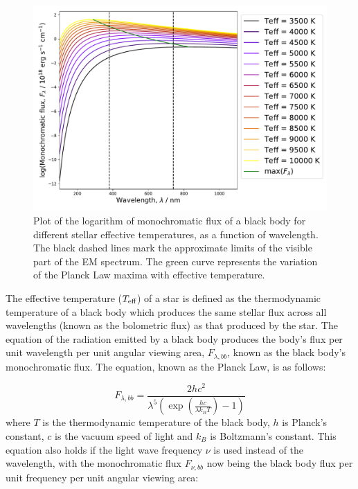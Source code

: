 \documentclass[12pt, a4paper]{report}
\begin{document}
\begin{figure}[h!]
\begin{center}
\includegraphics[width=1.0\textwidth]{blackbody_teff_logF_illustration.pdf}
\caption{Plot of the logarithm of monochromatic flux of a black body for different stellar effective temperatures, as a function of wavelength. The black dashed lines mark the approximate limits of the visible part of the EM spectrum. The green curve represents the variation of the Planck Law maxima with effective temperature.}
\label{planck_curve}
\end{center}
\end{figure}

The effective temperature ($T_{\textnormal{eff}}$) of a star is defined as the thermodynamic temperature of a black body which produces the same stellar flux across all wavelengths (known as the bolometric flux) as that produced by the star. The equation of the radiation emitted by a black body produces the body's flux per unit wavelength per unit angular viewing area, $F_{\lambda,bb}$, known as the black body's monochromatic flux. The equation, known as the Planck Law, is as follows:


\begin{equation}
F_{\lambda,bb} = \frac{2hc^{2}}{\lambda^{5}\left(\exp\left({\frac{hc}{\lambda k_{B}T}}\right) - 1\right)}
\label{planck_bb}
\end{equation}
where $T$ is the thermodynamic temperature of the black body, $h$ is Planck's constant, $c$ is the vacuum speed of light and $k_{B}$ is Boltzmann's constant. This equation also holds if the light wave frequency $\nu$ is used instead of the wavelength, with the monochromatic flux $F_{\nu,bb}$ now being the black body flux per unit frequency per unit angular viewing area:
\end{document}

